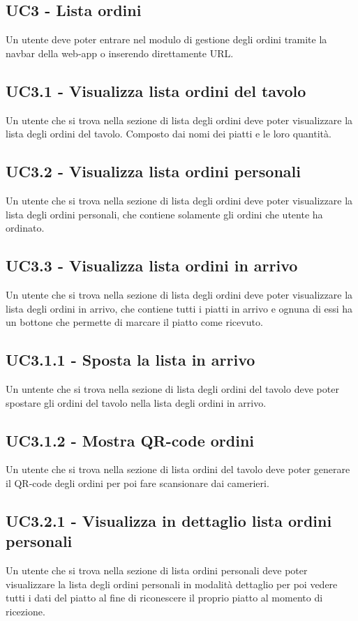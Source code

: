 \subsection{UC3 - Lista ordini}
Un utente deve poter entrare nel modulo di gestione degli ordini tramite la navbar della web-app o inserendo direttamente URL.
\subsection{UC3.1 - Visualizza lista ordini del tavolo}
Un utente che si trova nella sezione di lista degli ordini deve poter visualizzare la lista degli ordini del tavolo. Composto dai nomi dei piatti e le loro quantità.
\subsection{UC3.2 - Visualizza lista ordini personali}
Un utente che si trova nella sezione di lista degli ordini deve poter visualizzare la lista degli ordini personali, che contiene solamente gli ordini che utente ha ordinato.
\subsection{UC3.3 - Visualizza lista ordini in arrivo}
Un utente che si trova nella sezione di lista degli ordini deve poter visualizzare la lista degli ordini in arrivo, che contiene tutti i piatti in arrivo e ognuna di essi ha un bottone che permette di marcare il piatto come ricevuto.
\subsection{UC3.1.1 - Sposta la lista in arrivo}
Un untente che si trova nella sezione di lista degli ordini del tavolo deve poter spostare gli ordini del tavolo nella lista degli ordini in arrivo.
\subsection{UC3.1.2 - Mostra QR-code ordini}
Un utente che si trova nella sezione di lista ordini del tavolo deve poter generare il QR-code degli ordini per poi fare scansionare dai camerieri.
\subsection{UC3.2.1 - Visualizza in dettaglio lista ordini personali}
Un utente che si trova nella sezione di lista ordini personali deve poter visualizzare la lista degli ordini personali in modalità dettaglio per poi vedere tutti i dati del piatto al fine di riconescere il proprio piatto al momento di ricezione.
